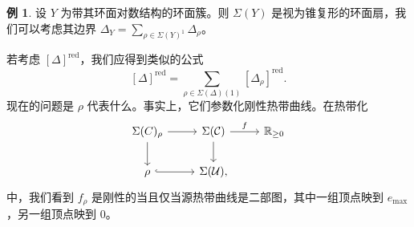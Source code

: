 \documentclass{amsart}
\theoremstyle{definition}
\newtheorem{exm}[thm]{例}
\theoremstyle{remark}
\theoremstyle{plain}
\theoremstyle{definition}
\theoremstyle{remark}
\newcommand{\R}{\mathbb{R}}
\newcommand{\mc}[1]{\mathcal{#1}}
\newcommand{\on}[1]{\operatorname{#1}}
\newcommand{\1}{\mathbf{1}}
\newcommand{\2}{\mathbf{2}}
\newcommand{\3}{\mathbf{3}}
\begin{document}
\begin{exm}
    设 \(Y\) 为带其环面对数结构的环面簇。则 \(\Sigma(Y)\) 是视为锥复形的环面扇，我们可以考虑其边界 \(\Delta_Y = \sum_{\rho \in \Sigma(Y)^1} \Delta_{\rho}\)。
\end{exm}

若考虑 \([\Delta]^{\on{red}}\)，我们应得到类似的公式
\[ [\Delta]^{\on{red}} = \sum_{\rho \in \Sigma(\Delta)(1)} [\Delta_{\rho}]^{\on{red}}. \]
现在的问题是 \(\rho\) 代表什么。事实上，它们参数化刚性热带曲线。在热带化
\begin{equation*}
\begin{tikzcd}
    \Sigma(C)_{\rho} \ar{d} \ar{r} & \Sigma(\mc{C}) \ar{r}{f} \ar{d} & \R_{\geq 0} \\
    \rho \ar[hookrightarrow]{r} & \Sigma(\mc{U}),
\end{tikzcd}
\end{equation*}
中，我们看到 \(f_{\rho}\) 是刚性的当且仅当源热带曲线是二部图，其中一组顶点映到 \(e_{\max}\)，另一组顶点映到 \(0\)。
\end{document}
